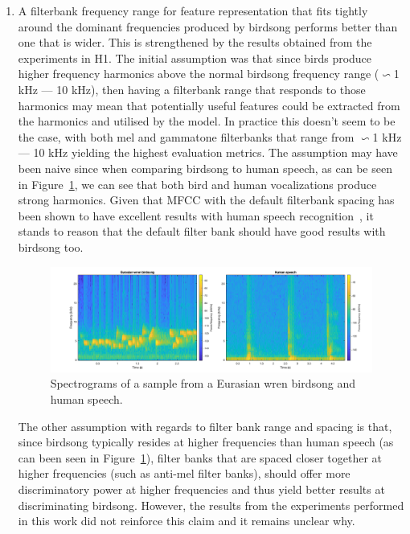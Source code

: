 \begin{enumerate}

  \item A filterbank frequency range for feature representation that fits
    tightly around the dominant frequencies produced by birdsong performs better
    than one that is wider. This is strengthened by the results obtained from
    the experiments in H1. The initial assumption was that since birds produce
    higher frequency harmonics above the normal birdsong frequency range
    ($\backsim$1 kHz --- 10 kHz), then having a filterbank range that responds
    to those harmonics may mean that potentially useful features could be
    extracted from the harmonics and utilised by the model. In practice this
    doesn't seem to be the case, with both mel and gammatone filterbanks that
    range from $\backsim$1 kHz --- 10 kHz yielding the highest evaluation
    metrics. The assumption may have been naive since when comparing birdsong to
    human speech, as can be seen in Figure~\ref{fig:wren_vs_human}, we can see
    that both bird and human vocalizations produce strong harmonics. Given that
    MFCC with the default filterbank spacing has been shown to have excellent
    results with human speech recognition~\cite{muda2010voice}, it stands to
    reason that the default filter bank should have good results with birdsong
    too.

    \begin{figure}[ht]
      \centering
      \includegraphics[width=\textwidth]{figures/wren_vs_human.png}
      \caption{Spectrograms of a sample from a Eurasian wren birdsong and human
      speech.}\label{fig:wren_vs_human}
    \end{figure}

    The other assumption with regards to filter bank range and spacing is that,
    since birdsong typically resides at higher frequencies than human speech (as
    can been seen in Figure~\ref{fig:wren_vs_human}), filter banks that are
    spaced closer together at higher frequencies (such as anti-mel filter
    banks), should offer more discriminatory power at higher frequencies and
    thus yield better results at discriminating birdsong. However, the results
    from the experiments performed in this work did not reinforce this claim and
    it remains unclear why.


\end{enumerate}
